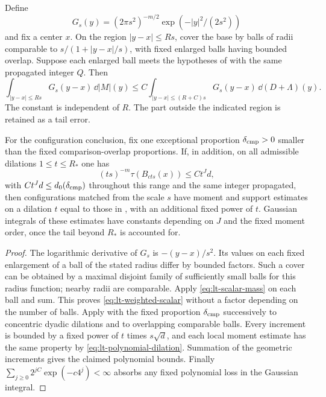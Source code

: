 \begin{corollary}
\label{lt:weightedballs}
Define
\[
 G_s(y)=(2\pi s^2)^{-m/2}\exp(-|y|^2/(2s^2))
\]
and fix a center $x$.
On the region $|y-x|\le Rs$, cover the base by balls of radii comparable to
$s/(1+|y-x|/s)$, with fixed enlarged balls having bounded overlap.
Suppose each enlarged ball meets the hypotheses of  with
the same propagated integer $Q$.  Then
\begin{equation}\label{eq:lt-weighted-scalar}
 \int_{|y-x|\le Rs}G_s(y-x)\,\dd|M|(y)
 \le C\int_{|y-x|\le (R+C)s}G_s(y-x)\,\dd(D+\Lambda)(y).
\end{equation}
The constant is independent of $R$.  The part outside the indicated region
is retained as a tail error.

For the configuration conclusion, fix one exceptional proportion
$\delta_{\rm cmp}>0$ smaller than the fixed comparison-overlap proportions.
If, in addition, on all admissible dilations $1\le t\le R_*$ one has
\begin{equation}\label{eq:lt-polynomial-dilation}
 (ts)^{-m}\tau(B_{cts}(x))\le C t^Jd,
\end{equation}
with $Ct^Jd\le d_0(\delta_{\rm cmp})$ throughout this range and the same
integer propagated, then configurations
matched from the scale $s$ have moment and support estimates on a dilation
$t$ equal to those in , with an additional fixed power of
$t$.  Gaussian integrals of these estimates have constants depending on
$J$ and the fixed moment order, once the tail beyond $R_*$ is accounted for.
\end{corollary}

\begin{proof}
The logarithmic derivative of $G_s$ is $-(y-x)/s^2$.  Its values on each
fixed enlargement of a ball of the stated radius differ by bounded factors.
Such a cover can be obtained by a maximal disjoint family of sufficiently
small balls for this radius function; nearby radii are comparable.  Apply
\eqref{eq:lt-scalar-mass} on each ball and sum.  This proves
\eqref{eq:lt-weighted-scalar} without a factor depending on the number of
balls.  Apply  with the fixed proportion $\delta_{\rm cmp}$
successively to concentric dyadic dilations
and to overlapping comparable balls.  Every increment is bounded by a
fixed power of $t$ times $s\sqrt d$, and each local moment estimate has the
same property by \eqref{eq:lt-polynomial-dilation}.  Summation of the
geometric increments gives the claimed polynomial bounds.  Finally
$\sum_{j\ge0}2^{jC}\exp(-c4^j)<\infty$ absorbs any fixed polynomial loss
in the Gaussian integral.
\end{proof}

